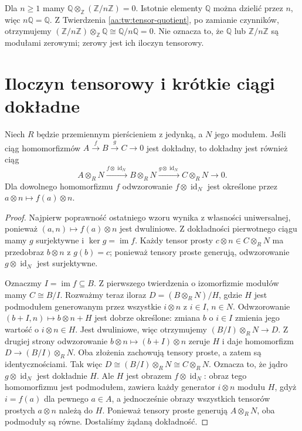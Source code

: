 \begin{przyklad}
\label{aa:prz:tensor-rational-torsion}
Dla $n\ge1$ mamy $\mathbb Q\otimes_{\mathbb Z}
(\mathbb Z/n\mathbb Z)=0$. Istotnie elementy
$\mathbb Q$ można dzielić przez $n$, więc
$n\mathbb Q=\mathbb Q$. Z Twierdzenia
\ref{aa:tw:tensor-quotient}, po zamianie czynników,
otrzymujemy $(\mathbb Z/n\mathbb Z)\otimes_{\mathbb Z}
\mathbb Q\cong\mathbb Q/n\mathbb Q=0$.
Nie oznacza to, że $\mathbb Q$ lub $\mathbb Z/n\mathbb Z$
są modułami zerowymi; zerowy jest ich iloczyn tensorowy.
\end{przyklad}

\section{Iloczyn tensorowy i krótkie ciągi dokładne}
\begin{twierdzenie}
\label{aa:tw:tensor-right-exact}
Niech $R$ będzie przemiennym pierścieniem z jedynką,
a $N$ jego modułem. Jeśli ciąg homomorfizmów
$A\xrightarrow{f}B\xrightarrow{g}C\to0$ jest dokładny,
to dokładny jest również ciąg
\[
 A\otimes_RN\xrightarrow{f\otimes\operatorname{id}_N}
 B\otimes_RN\xrightarrow{g\otimes\operatorname{id}_N}
 C\otimes_RN\longrightarrow0.
\]
Dla dowolnego homomorfizmu $f$ odwzorowanie
$f\otimes\operatorname{id}_N$ jest określone przez
$a\otimes n\mapsto f(a)\otimes n$.
\end{twierdzenie}
\begin{proof}
Najpierw poprawność ostatniego wzoru wynika z własności
uniwersalnej, ponieważ $(a,n)\mapsto f(a)\otimes n$
jest dwuliniowe. Z dokładności pierwotnego ciągu
mamy $g$ surjektywne i $\ker g=\operatorname{im}f$.
Każdy tensor prosty $c\otimes n\in C\otimes_RN$
ma przedobraz $b\otimes n$ z $g(b)=c$; ponieważ
tensory proste generują, odwzorowanie
$g\otimes\operatorname{id}_N$ jest surjektywne.

Oznaczmy $I=\operatorname{im}f\subseteq B$.
Z pierwszego twierdzenia o izomorfizmie modułów
mamy $C\cong B/I$. Rozważmy teraz iloraz
$D=(B\otimes_RN)/H$, gdzie $H$ jest podmodułem
generowanym przez wszystkie $i\otimes n$ z
$i\in I$, $n\in N$. Odwzorowanie
$(b+I,n)\mapsto b\otimes n+H$
jest dobrze określone: zmiana $b$ o $i\in I$
zmienia jego wartość o $i\otimes n\in H$.
Jest dwuliniowe, więc otrzymujemy
$(B/I)\otimes_RN\to D$.
Z drugiej strony odwzorowanie
$b\otimes n\mapsto(b+I)\otimes n$ zeruje $H$
i daje homomorfizm $D\to(B/I)\otimes_RN$.
Oba złożenia zachowują tensory proste, a zatem są
identycznościami. Tak więc
$D\cong(B/I)\otimes_RN\cong C\otimes_RN$.
Oznacza to, że jądro $g\otimes\operatorname{id}_N$
jest dokładnie $H$. Ale $H$ jest obrazem
$f\otimes\operatorname{id}_N$: obraz tego homomorfizmu
jest podmodułem, zawiera każdy generator $i\otimes n$
modułu $H$, gdyż $i=f(a)$ dla pewnego $a\in A$,
a jednocześnie obrazy wszystkich tensorów prostych
$a\otimes n$ należą do $H$. Ponieważ tensory proste
generują $A\otimes_RN$, oba podmoduły są równe.
Dostaliśmy żądaną dokładność.
\end{proof}

